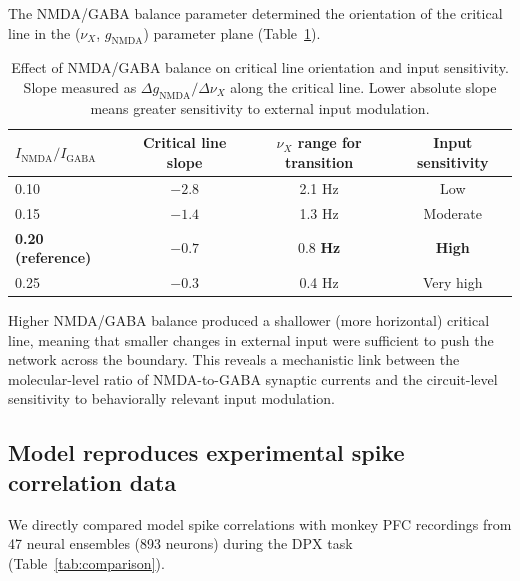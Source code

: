 \documentclass[11pt]{article}
\begin{document}
The NMDA/GABA balance parameter determined the orientation of the critical line in the ($\nu_X$, $g_{\text{NMDA}}$) parameter plane (Table~\ref{tab:balance}).

\begin{table}[H]
\centering
\caption{Effect of NMDA/GABA balance on critical line orientation and input sensitivity. Slope measured as $\Delta g_{\text{NMDA}} / \Delta \nu_X$ along the critical line. Lower absolute slope means greater sensitivity to external input modulation.}
\label{tab:balance}
\begin{tabular}{lccc}
\toprule
\textbf{$I_{\text{NMDA}}/I_{\text{GABA}}$} & \textbf{Critical line slope} & \textbf{$\nu_X$ range for transition} & \textbf{Input sensitivity} \\
\midrule
0.10 & $-2.8$ & 2.1 Hz & Low \\
0.15 & $-1.4$ & 1.3 Hz & Moderate \\
\textbf{0.20 (reference)} & $\mathbf{-0.7}$ & $\mathbf{0.8}$ \textbf{Hz} & \textbf{High} \\
0.25 & $-0.3$ & 0.4 Hz & Very high \\
\bottomrule
\end{tabular}
\end{table}

Higher NMDA/GABA balance produced a shallower (more horizontal) critical line, meaning that smaller changes in external input were sufficient to push the network across the boundary. This reveals a mechanistic link between the molecular-level ratio of NMDA-to-GABA synaptic currents and the circuit-level sensitivity to behaviorally relevant input modulation.

\subsection{Model reproduces experimental spike correlation data}

We directly compared model spike correlations with monkey PFC recordings from 47 neural ensembles (893 neurons) during the DPX task (Table~\ref{tab:comparison}).
\end{document}
